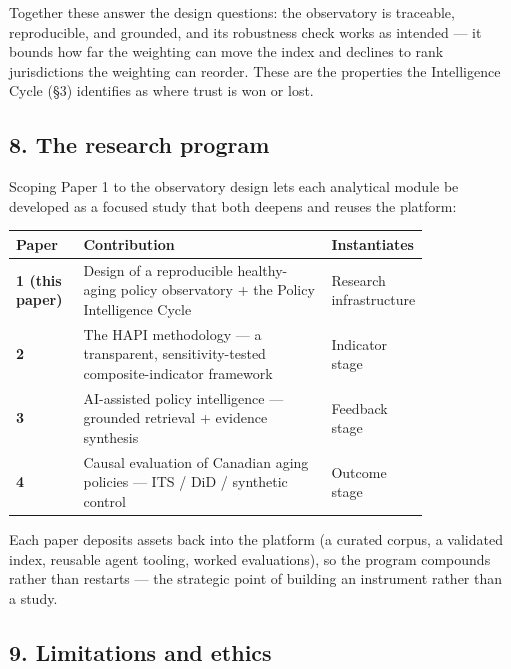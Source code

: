 \documentclass[
  11pt,
]{article}
\begin{document}
Together these answer the design questions: the observatory is
traceable, reproducible, and grounded, and its robustness check works as
intended --- it bounds how far the weighting can move the index and
declines to rank jurisdictions the weighting can reorder. These are the
properties the Intelligence Cycle (§3) identifies as where trust is won
or lost.

\hypertarget{8-the-research-program}{%
\subsection{8. The research program}\label{8-the-research-program}}

Scoping Paper 1 to the observatory design lets each analytical module be
developed as a focused study that both deepens and reuses the platform:

\begin{longtable}[]{@{}lp{0.60\linewidth}p{0.22\linewidth}@{}}
\toprule\noalign{}
Paper & Contribution & Instantiates \\
\midrule\noalign{}
\endhead
\bottomrule\noalign{}
\endlastfoot
\textbf{1 (this paper)} & Design of a reproducible healthy-aging policy
observatory + the Policy Intelligence Cycle & Research infrastructure \\
\textbf{2} & The HAPI methodology --- a transparent, sensitivity-tested
composite-indicator framework & Indicator stage \\
\textbf{3} & AI-assisted policy intelligence --- grounded retrieval +
evidence synthesis & Feedback stage \\
\textbf{4} & Causal evaluation of Canadian aging policies --- ITS / DiD
/ synthetic control & Outcome stage \\
\end{longtable}

Each paper deposits assets back into the platform (a curated corpus, a
validated index, reusable agent tooling, worked evaluations), so the
program compounds rather than restarts --- the strategic point of
building an instrument rather than a study.

\hypertarget{9-limitations-and-ethics}{%
\subsection{9. Limitations and ethics}\label{9-limitations-and-ethics}}
\end{document}
